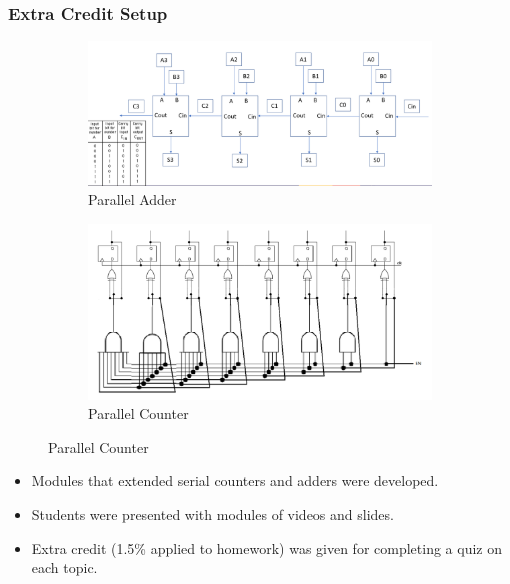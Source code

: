 \documentclass{beamer}
\begin{document}
\begin{frame}
    \frametitle{Extra Credit Setup}

    \begin{figure}[htbp]
      \centering
      \begin{subfigure}[b]{0.45\textwidth}
        \centering
        \includegraphics[width=\linewidth]{parallel_add.png}
        \caption{Parallel Adder}
        \label{fig:subfig1}
      \end{subfigure}
      \hfill
      \begin{subfigure}[b]{0.45\textwidth}
        \centering
        \includegraphics[width=\linewidth]{parallel_counter.png}
        \caption{Parallel Counter}
        \label{fig:subfig2}
      \end{subfigure}
    \end{figure}

    \begin{itemize}
        \item Modules that extended serial counters and adders were developed.
        \item Students were presented with modules of videos and slides.
        \item Extra credit (1.5\% applied to homework) was given for completing a quiz on each topic.
    \end{itemize}
     
\end{frame}
\end{document}
